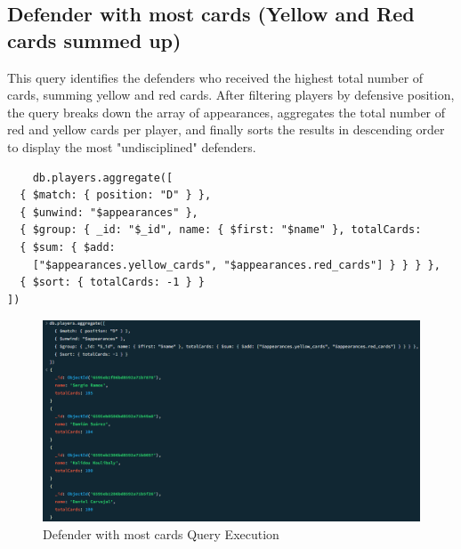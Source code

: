 \documentclass{Configuration_Files/PoliMi3i_thesis}
\begin{document}
\subsection{Defender with most cards (Yellow and Red cards summed up)}
This query identifies the defenders who received the highest total number of cards, summing yellow and red cards. After filtering players by defensive position, the query breaks down the array of appearances, aggregates the total number of red and yellow cards per player, and finally sorts the results in descending order to display the most "undisciplined" defenders.
\begin{verbatim}
    db.players.aggregate([
  { $match: { position: "D" } },
  { $unwind: "$appearances" },
  { $group: { _id: "$_id", name: { $first: "$name" }, totalCards: 
  { $sum: { $add: 
    ["$appearances.yellow_cards", "$appearances.red_cards"] } } } },
  { $sort: { totalCards: -1 } }
])
\end{verbatim}

\begin{figure}[htbp]
    \centering
    \includegraphics[scale=0.8]{Images/Queries/Defenders_most_cards/dmc.png}
    \caption{Defender with most cards  Query Execution}
\end{figure}
\end{document}
